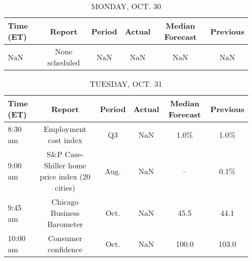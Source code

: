 \documentclass{article}%
\begin{document}
%
\normalsize%


\begin{table}[htbp]%
\caption{MONDAY, OCT. 30}%
\centering%
\begin{adjustbox}{width=1\textwidth}%
\begin{tabular}{lccccc}
\toprule
Time (ET) &         Report & Period & Actual & Median Forecast & Previous \\
\midrule
      NaN & None scheduled &    NaN &    NaN &             NaN &      NaN \\
\bottomrule
\end{tabular}
%
\end{adjustbox}%
\end{table}

%


\begin{table}[htbp]%
\caption{TUESDAY, OCT. 31}%
\centering%
\begin{adjustbox}{width=1\textwidth}%
\begin{tabular}{lccccc}
\toprule
Time (ET) &                                        Report & Period & Actual & Median Forecast & Previous \\
\midrule
  8:30 am &                         Employment cost index &     Q3 &    NaN &            1.0\% &     1.0\% \\
  9:00 am & S\&P Case-Shiller home price index (20 cities) &   Aug. &    NaN &              -- &     0.1\% \\
  9:45 am &                    Chicago Business Barometer &   Oct. &    NaN &            45.5 &     44.1 \\
 10:00 am &                           Consumer confidence &   Oct. &    NaN &           100.0 &    103.0 \\
\bottomrule
\end{tabular}
%
\end{adjustbox}%
\end{table}

%
\end{document}
